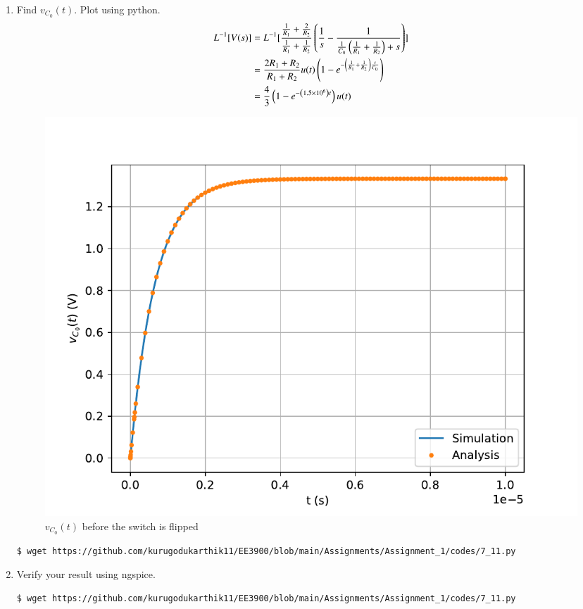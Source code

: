 \documentclass[journal,12pt,twocolumn]{IEEEtran}
\renewcommand\thesection{\arabic{section}}
\begin{document}
\begin{enumerate}[label=\arabic*.,ref=\thesection.\theenumi]
\item Find $v_{C_0}(t)$.  Plot using python. \\
\solution
\begin{align}
L^{-1}[V(s)]&=L^{-1}[\frac{\frac{1}{R_1} + \frac{2}{R_2}}{\frac{1}{R_1} + \frac{1}{R_2}}\left(\frac{1}{s} - \frac{1}{\frac{1}{C_0}\left(\frac{1}{R_1} + \frac{1}{R_2}\right) + s}\right)] \\
&=\frac{2R_1 + R_2}{R_1 + R_2}u(t)\left(1 - e^{-\left(\frac{1}{R_1} + \frac{1}{R_2}\right)\frac{t}{C_0}}\right) \\
&=\frac{4}{3}\left(1 - e^{-\left(1.5 \times 10^6\right)t}\right)u(t)
\end{align}
\begin{figure}[!ht]
\centering
\includegraphics[width=\columnwidth]{figs/2_6.pdf}
\caption{$v_{C_0}(t)$ before the switch is flipped}
\label{fig:v1-t}
\end{figure}
\begin{lstlisting}
$ wget https://github.com/kurugodukarthik11/EE3900/blob/main/Assignments/Assignment_1/codes/7_11.py
\end{lstlisting}
\item Verify your result using ngspice.
\solution
\begin{lstlisting}
$ wget https://github.com/kurugodukarthik11/EE3900/blob/main/Assignments/Assignment_1/codes/7_11.py
\end{lstlisting}
\end{enumerate}
\end{document}
